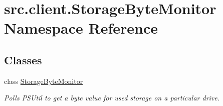 \hypertarget{namespacesrc_1_1client_1_1_storage_byte_monitor}{\section{src.\-client.\-Storage\-Byte\-Monitor Namespace Reference}
\label{namespacesrc_1_1client_1_1_storage_byte_monitor}
}
\subsection*{Classes}
\begin{DoxyCompactItemize}
\item 
class \hyperlink{classsrc_1_1client_1_1_storage_byte_monitor_1_1_storage_byte_monitor}{Storage\-Byte\-Monitor}
\begin{DoxyCompactList}\small\item\em Polls P\-S\-Util to get a byte value for used storage on a particular drive. \end{DoxyCompactList}\end{DoxyCompactItemize}
